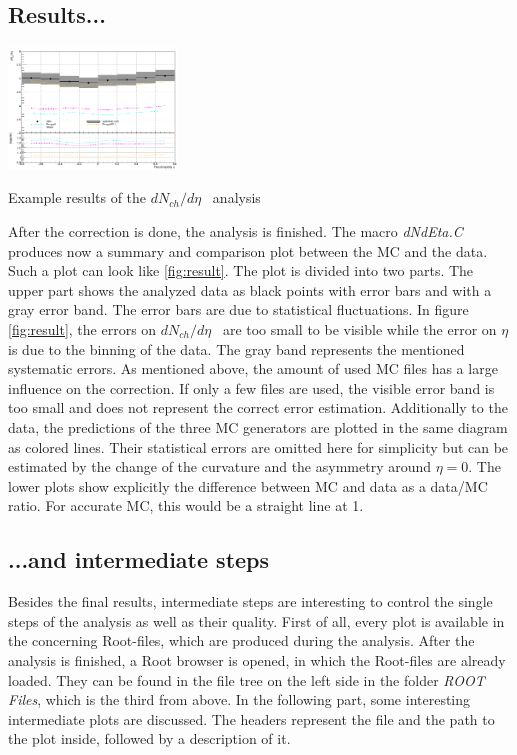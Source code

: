 \documentclass{article}
\newcommand\dNdEta{$dN_{ch}/d\eta$}
\begin{document}
\subsection{Results...}
\label{subsec:results}
\begin{floatingfigure}[r]{55mm}
\centering
\includegraphics[width=45mm, natwidth=796, natheight=574]{images/dNdEta.png}
\caption{Example results of the \dNdEta~ analysis}
\label{fig:result}
\end{floatingfigure}
After the correction is done, the analysis is finished. The macro \textit{dNdEta.C} produces now a summary and comparison plot between the MC and the data. Such a plot can look like \ref{fig:result}. The plot is divided into two parts. The upper part shows the analyzed data as black points with error bars and with a gray error band. The error bars are due to statistical fluctuations. In figure \ref{fig:result}, the errors on \dNdEta~ are too small to be visible while the error on $\eta$ is due to the binning of the data. The gray band represents the mentioned systematic errors. As mentioned above, the amount of used MC files has a large influence on the correction. If only a few files are used, the visible error band is too small and does not represent the correct error estimation. Additionally to the data, the predictions of the three MC generators are plotted in the same diagram as colored lines. Their statistical errors are omitted here for simplicity but can be estimated by the change of the curvature and the asymmetry around $\eta = 0$. The lower plots show explicitly the difference between MC and data as a data/MC ratio. For accurate MC, this would be a straight line at 1.\\

\subsection{...and intermediate steps}
\label{subsec:intermediate}
Besides the final results, intermediate steps are interesting to control the single steps of the analysis as well as their quality. First of all, every plot is available in the concerning Root-files, which are produced during the analysis. After the analysis is finished, a Root browser is opened, in which the Root-files are already loaded. They can be found in the file tree on the left side in the folder \textit{ROOT Files}, which is the third from above. In the following part, some interesting intermediate plots are discussed. The headers represent the file and the path to the plot inside, followed by a description of it.
\end{document}

